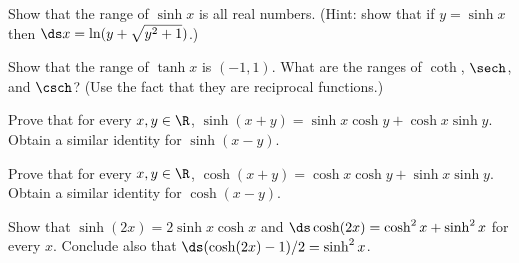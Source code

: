 \begin{enumialphparenastyle}
\begin{ex} 
Show that the range of $\sinh x$ is all real
numbers. (Hint: show that if $y=\sinh x$ then 
$\ds x =\ln (y+\sqrt{y^2+1})$.) 
\end{ex}

\begin{ex} 
Show that the range of $\tanh x$ is $(-1,1)$. What
are the ranges of $\coth$, $\sech$, and $\csch$? 
(Use the fact that they are reciprocal functions.) 
\end{ex}

\begin{ex} 
Prove that for every $x,y\in\R$, $\sinh (x+y)
=\sinh x \cosh y + \cosh x \sinh y$. Obtain a similar identity for
$\sinh(x-y)$.
\end{ex}

\begin{ex} 
Prove that for every $x,y\in\R$, $\cosh (x+y) =\cosh x \cosh y + \sinh x
  \sinh y$. Obtain a similar identity for $\cosh(x-y)$.
\end{ex}

\begin{ex} 
Show that $\sinh(2x)=2\sinh x \cosh x$ and $\ds \cosh(2x)=\cosh^2 x
+\sinh^2 x$ for every $x$.  Conclude also that $\ds (\cosh (2x) -1)/2 = \sinh
^2 x$.
\end{ex}

%

\end{enumialphparenastyle}